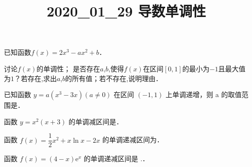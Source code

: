 \documentclass[a4paper, adobe]{BHCexam}
\begin{document}
\title{2020_01_29 导数单调性}
\subtitle{}
\author{}
\date{}
\maketitle
\begin{groups}
\begin{questions}[s]
\begin{minipage}{\textwidth}
\question[0] 已知函数$f(x)=2x ^{3} -ax ^{2} +b$．
\begin{subquestions}
    \subquestion 讨论$f(x)$的单调性； 
    \subquestion 是否存在$a$,$b$,使得$f(x)$在区间$[0 , 1]$的最小为$-1$且最大值为$1$？若存在,求出$a$,$b$的所有值；若不存在,说明理由．
\end{subquestions}
\begin{solution}{8cm}

\end{solution}
\end{minipage}
\begin{minipage}{\textwidth}
\question[0] 已知函数 $y=a\left(x^3-3x\right)\left(a\neq 0\right)$ 在区间 $\left(-1,1\right)$ 上单调递增，则 a 的取值范围是\key{$\left(-\infty,0\right)$}．
\begin{solution}{4cm}

\end{solution}
\end{minipage}
\begin{minipage}{\textwidth}
\question[0] 函数 $y=x^2\left(x+3\right)$ 的单调减区间是．
\begin{solution}{4cm}

\end{solution}
\end{minipage}
\begin{minipage}{\textwidth}
\question[0] 函数 $f\left(x\right) = \dfrac{1}{2}{x^2} + x\ln x - 2x$ 的单调递减区间为．
\begin{solution}{4cm}

\end{solution}
\end{minipage}
\begin{minipage}{\textwidth}
\question[0] 函数 $f\left(x\right)=\left(4-x\right){\mathrm {e}}^x$ 的单调递减区间是 .．
\begin{solution}{4cm}


\end{solution}
\end{minipage}
\end{questions}
\end{groups}
\end{document}

